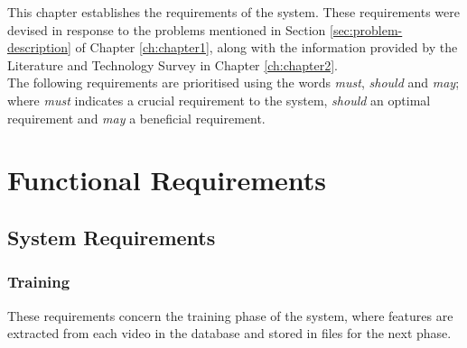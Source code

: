 This chapter establishes the requirements of the system. These requirements were devised in response to the problems mentioned in Section \ref{sec:problem-description} of Chapter \ref{ch:chapter1}, along with the information provided by the Literature and Technology Survey in Chapter \ref{ch:chapter2}.\\

The following requirements are prioritised using the words \textit{must}, \textit{should} and \textit{may}; where \textit{must} indicates a crucial requirement to the system, \textit{should} an optimal requirement and \textit{may} a beneficial requirement. 

\section{Functional Requirements}

\subsection{System Requirements}

\subsubsection{Training}

These requirements concern the training phase of the system, where features are extracted from each video in the database and stored in files for the next phase.

